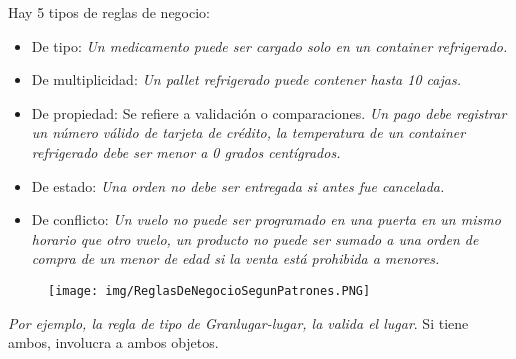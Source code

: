 Hay 5 tipos de reglas de negocio: 
\begin{itemize}
\item De tipo: \textit{Un medicamento puede ser cargado solo en un container refrigerado.}
\item De multiplicidad: \textit{Un pallet refrigerado puede contener hasta 10 cajas.}
\item De propiedad: Se refiere a validación o comparaciones. \textit{Un pago debe registrar un número válido de tarjeta de crédito, la temperatura de un container refrigerado debe ser menor a 0 grados centígrados.}
\item De estado: \textit{Una orden no debe ser entregada si antes fue cancelada.}
\item De conflicto: \textit{Un vuelo no puede ser programado en una puerta en un mismo horario que otro vuelo, un producto no puede ser sumado a una orden de compra de un menor de edad si la venta está prohibida a menores.}
\end{itemize}

\begin{figure}[!htb]
    \centering
    \texttt{[image: img/ReglasDeNegocioSegunPatrones.PNG]}
\end{figure}

\textit{Por ejemplo, la regla de tipo de Granlugar-lugar, la valida el lugar}. Si tiene ambos, involucra a ambos objetos.